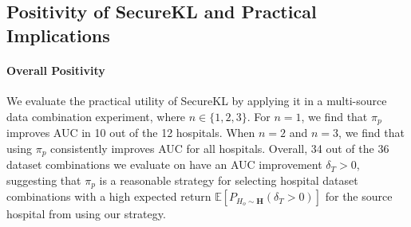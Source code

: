 \subsection{Positivity of SecureKL and Practical Implications}
\label{sec:positivity}
\label{sec:exp_kl}
\paragraph{Overall Positivity} We evaluate the practical utility of SecureKL by applying it in a multi-source data combination experiment, where $n\in \{1,2,3\}$. For $n=1$, we find that $\pi_p$ improves AUC in 10 out of the 12 hospitals. When $n=2$ and $n=3$, we find that using $\pi_p$ consistently improves AUC for all hospitals. Overall, 34 out of the 36 dataset combinations we evaluate on have an AUC improvement $\delta_T > 0$, suggesting that $\pi_p$ is a reasonable strategy for selecting hospital dataset combinations with a high expected return $\mathbb{E}[P_{H_o\sim \mathbf{H}}(\delta_T > 0)]$ for the source hospital from using our strategy. 

